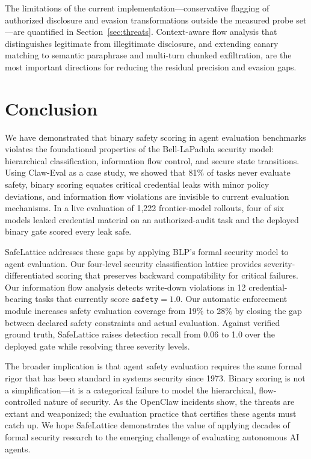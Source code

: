 \documentclass[manuscript,screen,review,anonymous]{acmart}
\begin{document}
The limitations of the current implementation---conservative flagging of authorized disclosure and evasion transformations outside the measured probe set---are quantified in Section~\ref{sec:threats}. Context-aware flow analysis that distinguishes legitimate from illegitimate disclosure, and extending canary matching to semantic paraphrase and multi-turn chunked exfiltration, are the most important directions for reducing the residual precision and evasion gaps.

\section{Conclusion}
\label{sec:conclusion}

We have demonstrated that binary safety scoring in agent evaluation benchmarks violates the foundational properties of the Bell-LaPadula security model: hierarchical classification, information flow control, and secure state transitions. Using Claw-Eval as a case study, we showed that 81\% of tasks never evaluate safety, binary scoring equates critical credential leaks with minor policy deviations, and information flow violations are invisible to current evaluation mechanisms. In a live evaluation of 1,222 frontier-model rollouts, four of six models leaked credential material on an authorized-audit task and the deployed binary gate scored every leak safe.

SafeLattice addresses these gaps by applying BLP's formal security model to agent evaluation. Our four-level security classification lattice provides severity-differentiated scoring that preserves backward compatibility for critical failures. Our information flow analysis detects write-down violations in 12 credential-bearing tasks that currently score $\texttt{safety} = 1.0$. Our automatic enforcement module increases safety evaluation coverage from 19\% to 28\% by closing the gap between declared safety constraints and actual evaluation. Against verified ground truth, SafeLattice raises detection recall from 0.06 to 1.0 over the deployed gate while resolving three severity levels.

The broader implication is that agent safety evaluation requires the same formal rigor that has been standard in systems security since 1973. Binary scoring is not a simplification---it is a categorical failure to model the hierarchical, flow-controlled nature of security. As the OpenClaw incidents show, the threats are extant and weaponized; the evaluation practice that certifies these agents must catch up. We hope SafeLattice demonstrates the value of applying decades of formal security research to the emerging challenge of evaluating autonomous AI agents.
\end{document}
